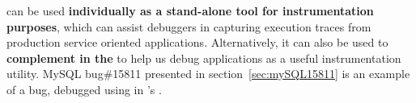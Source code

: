 \iprobe can be used \textbf{individually as a stand-alone tool for instrumentation purposes}, which can assist debuggers in capturing execution traces from production service oriented applications.
Alternatively, it can also be used to \textbf{complement \parikshan in the \debugcontainer} to help us debug applications as a useful instrumentation utility.
MySQL bug\#15811 presented in section~\ref{sec:mySQL15811} is an example of a bug, debugged using \iprobe in \parikshan's \debugcontainer.









